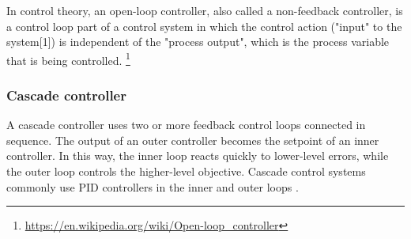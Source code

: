 \documentclass{book}
\providecommand{\seeherefooter}[1]{\footnote{\url{#1}}}
\begin{document}


In control theory, an open-loop controller, also called a non-feedback controller, is a control loop part of a control system in which the control action ("input" to the system[1]) is independent of the "process output", which is the process variable that is being controlled. \seeherefooter{https://en.wikipedia.org/wiki/Open-loop_controller}

\subsubsection{Cascade controller}


A cascade controller uses two or more feedback control loops connected in sequence. The output of an outer controller becomes the setpoint of an inner controller. In this way, the inner loop reacts quickly to lower-level errors, while the outer loop controls the higher-level objective. Cascade control systems commonly use PID controllers in the inner and outer loops \cite{lee-1998-pid-controller-tuning-for-cascade-control-systems}.
\end{document}
